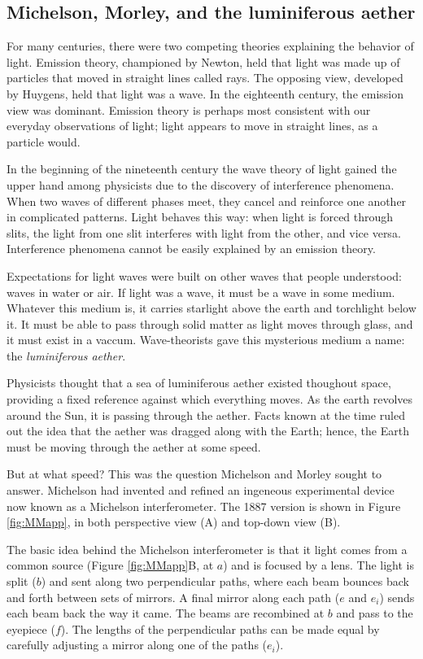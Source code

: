 \documentclass[english,floatsintext,man]{apa6}
\theoremstyle{definition}
\theoremstyle{definition}
\theoremstyle{definition}
\theoremstyle{remark}
\begin{document}
\subsection{Michelson, Morley, and the luminiferous
aether}\label{michelson-morley-and-the-luminiferous-aether}

For many centuries, there were two competing theories explaining the
behavior of light. Emission theory, championed by Newton, held that
light was made up of particles that moved in straight lines called rays.
The opposing view, developed by Huygens, held that light was a wave. In
the eighteenth century, the emission view was dominant. Emission theory
is perhaps most consistent with our everyday observations of light;
light appears to move in straight lines, as a particle would.

In the beginning of the nineteenth century the wave theory of light
gained the upper hand among physicists due to the discovery of
interference phenomena. When two waves of different phases meet, they
cancel and reinforce one another in complicated patterns. Light behaves
this way: when light is forced through slits, the light from one slit
interferes with light from the other, and vice versa. Interference
phenomena cannot be easily explained by an emission theory.

Expectations for light waves were built on other waves that people
understood: waves in water or air. If light was a wave, it must be a
wave in some medium. Whatever this medium is, it carries starlight above
the earth and torchlight below it. It must be able to pass through solid
matter as light moves through glass, and it must exist in a vaccum.
Wave-theorists gave this mysterious medium a name: the
\emph{luminiferous aether}.

Physicists thought that a sea of luminiferous aether existed thoughout
space, providing a fixed reference against which everything moves. As
the earth revolves around the Sun, it is passing through the aether.
Facts known at the time ruled out the idea that the aether was dragged
along with the Earth; hence, the Earth must be moving through the aether
at some speed.

But at what speed? This was the question Michelson and Morley sought to
answer. Michelson had invented and refined an ingeneous experimental
device now known as a Michelson interferometer. The 1887 version is
shown in Figure \ref{fig:MMapp}, in both perspective view (A) and
top-down view (B).

The basic idea behind the Michelson interferometer is that it light
comes from a common source (Figure \ref{fig:MMapp}B, at \(a\)) and is
focused by a lens. The light is split (\(b\)) and sent along two
perpendicular paths, where each beam bounces back and forth between sets
of mirrors. A final mirror along each path (\(e\) and \(e_i\)) sends
each beam back the way it came. The beams are recombined at \(b\) and
pass to the eyepiece (\(f\)). The lengths of the perpendicular paths can
be made equal by carefully adjusting a mirror along one of the paths
(\(e_i\)).
\end{document}
